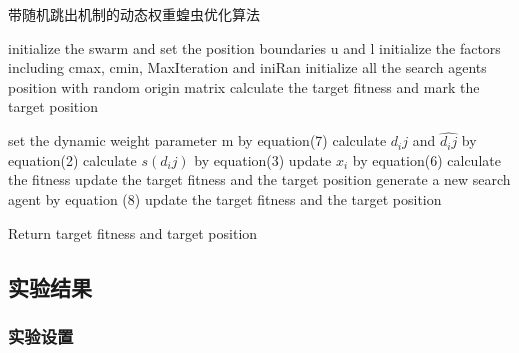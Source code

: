 \begin{algorithm}

    \caption{带随机跳出机制的动态权重蝗虫优化算法}
    \label{alg:DJGOA}
    
    \begin{algorithmic}[1]
    
    \State initialize the swarm and set the position boundaries u and l
    \State initialize the factors including cmax, cmin, MaxIteration and iniRan
    \State initialize all the search agents position with random origin matrix 
    \State calculate the target fitness and mark the target position
    
    \State set the dynamic weight parameter m by equation(7)
    \State calculate $d_ij$ and $\widehat{d_ij}$ by equation(2)
    \State calculate $s(d_ij)$ by equation(3)
    \State update $x_i$ by equation(6)
    \State calculate the fitness 
        \State update the target fitness and the target position
    \EndIf
        \State generate a new search agent by equation (8)
            \State update the target fitness and the target position
        \EndIf
    \EndIf
     
    \EndWhile

    \State Return target fitness and target position
    
    
    \end{algorithmic}
    
\end{algorithm}

\subsection{实验结果}
\subsubsection{实验设置}

